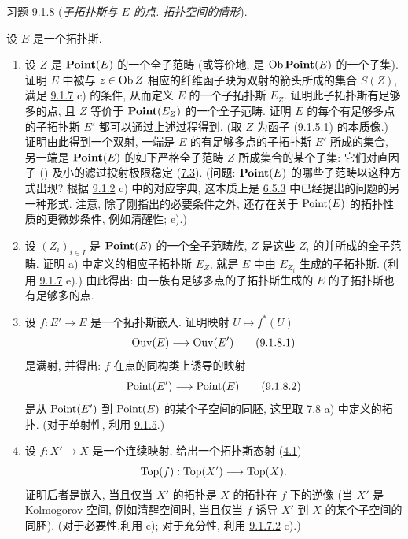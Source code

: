 \begin{enonce*}[remark]{习题 9.1.8}
(\emph{子拓扑斯与 $E$ 的点. 拓扑空间的情形}).

设 $E$ 是一个拓扑斯.
\begin{enumerate}
\renewcommand{\theenumi}{\alph{enumi}}
\renewcommand{\labelenumi}{\theenumi)}
\item 设 $Z$ 是 $\operatorname{\mathbf{Point}}(E)$ 的一个全子范畴
(或等价地, 是 $\operatorname{Ob}\operatorname{\mathbf{Point}}(E)$ 的一个子集).
证明 $E$ 中被与 $z\in\operatorname{Ob} Z$ 相应的纤维函子映为双射的箭头所成的集合 $S(Z)$,
满足 \hyperref[IV.exer9.1.7]{9.1.7} c) 的条件,
从而定义 $E$ 的一个子拓扑斯 $E_Z$.
证明此子拓扑斯有足够多的点,
且 $Z$ 等价于 $\operatorname{\mathbf{Point}}(E_Z)$ 的一个全子范畴.
证明 $E$ 的每个有足够多点的子拓扑斯 $E'$ 都可以通过上述过程得到.
(取 $Z$ 为函子 \hyperref[IV.eq9.1.5.1]{(9.1.5.1)} 的本质像.)
证明由此得到\pageoriginale 一个双射,
一端是 $E$ 的有足够多点的子拓扑斯 $E'$ 所成的集合,
另一端是 $\operatorname{\mathbf{Point}}(E)$ 的如下严格全子范畴 $Z$ 所成集合的某个子集:
它们对直因子
()
及小的滤过投射极限稳定 (\cf \hyperref[IV.subsec7.3]{7.3}).
(问题: $\operatorname{\mathbf{Point}}(E)$ 的哪些子范畴以这种方式出现?
根据 \hyperref[IV.rem9.1.2]{9.1.2} c) 中的对应字典,
这本质上是 \hyperref[IV.prop6.5.3]{6.5.3} 中已经提出的问题的另一种形式.
注意, 除了刚指出的必要条件之外,
还存在关于 $\operatorname{Point}(E)$ 的拓扑性质的更微妙条件,
例如清醒性; \cf e).)

\item 设 $(Z_i)_{i\in I}$ 是 $\operatorname{\mathbf{Point}}(E)$ 的一个全子范畴族,
$Z$ 是这些 $Z_i$ 的并所成的全子范畴.
证明 a) 中定义的相应子拓扑斯 $E_Z$,
就是 $E$ 中由 $E_{Z_i}$ 生成的子拓扑斯.
(利用 \hyperref[IV.exer9.1.7]{9.1.7} e).)
由此得出: 由一族有足够多点的子拓扑斯生成的 $E$ 的子拓扑斯也有足够多的点.

\item 设 $f:E'\rightarrow E$ 是一个拓扑斯嵌入.
证明映射 $U\mapsto f^{\ast}(U)$
\begin{equation*}
\operatorname{Ouv}(E)\longrightarrow \operatorname{Ouv}(E')\tag{9.1.8.1}
\end{equation*}
是满射, 并得出: $f$ 在点的同构类上诱导的映射
\begin{equation*}
\operatorname{Point}(E')\longrightarrow \operatorname{Point}(E)\tag{9.1.8.2}
\end{equation*}
是从 $\operatorname{Point}(E')$ 到 $\operatorname{Point}(E)$ 的某个子空间的同胚,
这里取 \hyperref[IV.exer7.8]{7.8} a) 中定义的拓扑.
(对于单射性, 利用 \hyperref[IV.cor9.1.5]{9.1.5}.)

\item 设 $f:X'\rightarrow X$ 是一个连续映射,
给出一个拓扑斯态射 (\hyperref[IV.subsec4.1]{4.1})
$$
\operatorname{Top}(f):\operatorname{Top}(X')\longrightarrow \operatorname{Top}(X){}.
$$
证明后者是嵌入,
当且仅当 $X'$ 的拓扑是 $X$ 的拓扑在 $f$ 下的逆像
(\ie 当 $X'$ 是 Kolmogorov 空间, 例如清醒空间时,
当且仅当 $f$ 诱导 $X'$ 到 $X$ 的某个子空间的同胚).
(对于必要性,\pageoriginale 利用 c);
对于充分性, 利用 \hyperref[IV.exer9.1.7.2]{9.1.7.2} c).)


\end{enumerate}
\end{enonce*}

